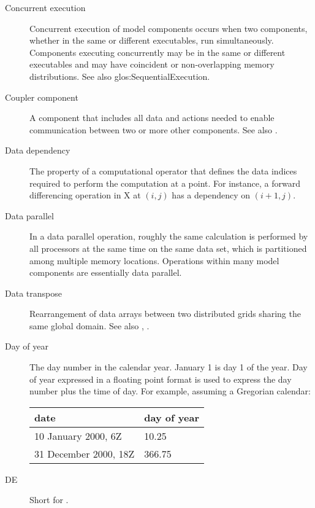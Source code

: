 \begin{description}
\item[Concurrent execution] \label{glos:ConcurrentExecution} 
  Concurrent execution of model components occurs when two components,
  whether in the same or different executables, run simultaneously.
  Components executing concurrently may be in the same or different 
  executables and may have coincident or non-overlapping memory 
  distributions.  See also 
  {glos:SequentialExecution}.

\item[Coupler component] \label{glos:Coupler}
  A component that includes all data and actions needed to enable 
  communication between two or more other components. 
  See also . 

\item[Data dependency] \label{glos:DataDep} The property of a computational
  operator that defines the data indices required to perform
  the computation at a point.  For instance, a forward differencing
  operation in X at $(i,j)$ has a dependency on $(i+1,j)$.

\item[Data parallel] \label{glos:DataParallel} In a data parallel operation,
  roughly the same calculation is performed by all processors at the same 
  time on the same data set, which is partitioned among multiple memory 
  locations.  Operations within many model components are essentially data 
  parallel.  

\item[Data transpose] \label{glos:DataTranspose} Rearrangement of data arrays 
  between two distributed grids sharing the same global domain.
  See also , 
  .

\item[Day of year] \label{glos:DayOfYear} The day number in the calendar year. 
  January 1 is day 1 of the year. Day of year expressed in a floating point 
  format is used to express the day number plus the time of day. 
  For example, assuming a Gregorian calendar:

\begin{tabular}{ll}
  {\bf date}              & {\bf day of year} \\
  \hline 
  10 January 2000, 6Z     & 10.25 \\
  31 December 2000, 18Z   & 366.75 
\end{tabular}

\item[DE] \label{glos:DE} 
  Short for .


\end{description}
